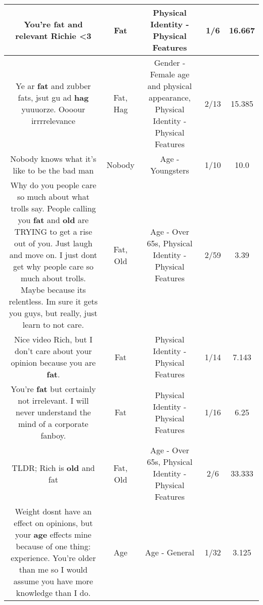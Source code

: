 \documentclass[11pt]{article}
\newlength\mylength
\begin{document}
\begin{center}
\begin{longtable}{|C{.65\mylength}|C{.30\mylength}|C{.12\mylength}|C{.12\mylength}|C{.12\mylength}|}
  \small You're \textbf{fat} and relevant Richie <3\normalsize   & Fat & Physical Identity - Physical Features & 1/6 & 16.667 \\  \hline
  \small Ye ar \textbf{fat} and zubber fats, jsut gu ad \textbf{hag} yuuuorze. Oooour irrrrelevance\normalsize   & Fat, Hag & Gender - Female age and physical appearance, Physical Identity - Physical Features & 2/13 & 15.385 \\  \hline
  \small Nobody knows what it's like to be the bad man\normalsize   & Nobody & Age - Youngsters & 1/10 & 10.0 \\  \hline
  \small Why do you people care so much about what trolls say. People calling you \textbf{fat} and \textbf{old} are TRYING to get a rise out of you. Just laugh and move on. I just dont get why people care so much about trolls. Maybe because its relentless. Im sure it gets you guys, but really, just learn to not care.\normalsize   & Fat, Old & Age - Over 65s, Physical Identity - Physical Features & 2/59 & 3.39 \\  \hline
  \small Nice video Rich, but I don't care about your opinion because you are \textbf{fat}.\normalsize   & Fat & Physical Identity - Physical Features & 1/14 & 7.143 \\  \hline
  \small You're \textbf{fat} but certainly not irrelevant.  I will never understand the mind of a corporate fanboy.\normalsize   & Fat & Physical Identity - Physical Features & 1/16 & 6.25 \\  \hline
  \small TLDR; Rich is \textbf{old} and fat\normalsize   & Fat, Old & Age - Over 65s, Physical Identity - Physical Features & 2/6 & 33.333 \\  \hline
  \small Weight dosnt have an effect on opinions, but your \textbf{age} effects mine because of one thing: experience. You're older than me so I would assume you have more knowledge than I do.\normalsize   & Age & Age - General & 1/32 & 3.125 \\  \hline

\end{longtable}
\end{center}
\end{document}
